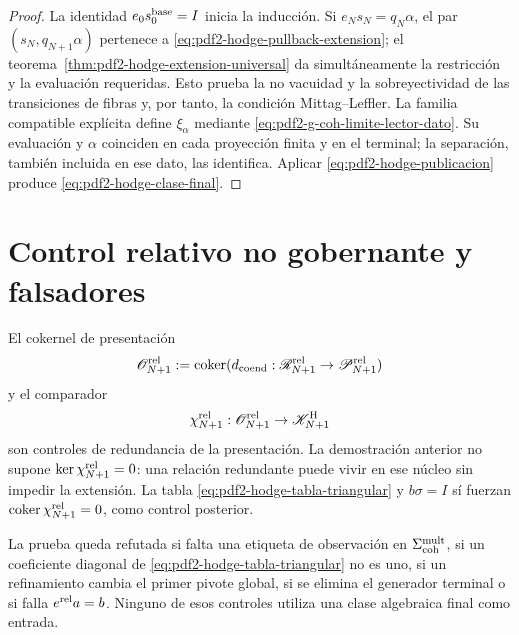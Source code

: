 \begin{proof}
La identidad $e_0s_0^{\rm base}=I$ inicia la inducción. Si
$e_Ns_N=q_N\alpha$, el par $(s_N,q_{N+1}\alpha)$ pertenece a
\eqref{eq:pdf2-hodge-pullback-extension}; el
teorema~\ref{thm:pdf2-hodge-extension-universal} da simultáneamente la restricción
y la evaluación requeridas. Esto prueba la no vacuidad y la sobreyectividad de
las transiciones de fibras y, por tanto, la condición Mittag--Leffler. La
familia compatible explícita define $\xi_\alpha$ mediante
\eqref{eq:pdf2-g-coh-limite-lector-dato}. Su evaluación y $\alpha$
coinciden en cada proyección finita y en el terminal; la separación, también
incluida en ese dato, las identifica. Aplicar
\eqref{eq:pdf2-hodge-publicacion} produce
\eqref{eq:pdf2-hodge-clase-final}.
\end{proof}

\section{Control relativo no gobernante y falsadores}

El cokernel de presentación
\begin{equation}\label{eq:pdf2-hodge-o-rel}
 \mathscr O_{N+1}^{\rm rel}:=\operatorname{coker}
 (d_{\rm coend}:\mathscr R_{N+1}^{\rm rel}\to
                  \mathscr P_{N+1}^{\rm rel})
\end{equation}
y el comparador
\begin{equation}\label{eq:pdf2-hodge-chi-rel}
 \chi_{N+1}^{\rm rel}:\mathscr O_{N+1}^{\rm rel}\to
 \mathscr K^{\rm H}_{N+1}
\end{equation}
son controles de redundancia de la presentación. La demostración anterior
no supone $\ker\chi_{N+1}^{\rm rel}=0$: una relación redundante puede vivir
en ese núcleo sin impedir la extensión. La tabla
\eqref{eq:pdf2-hodge-tabla-triangular} y
$b\sigma=I$ sí fuerzan
$\operatorname{coker}\chi_{N+1}^{\rm rel}=0$, como control posterior.

\begin{falsifier}
La prueba queda refutada si falta una etiqueta de observación en
$\Sigma_{\rm coh}^{\rm mult}$, si un coeficiente diagonal de
\eqref{eq:pdf2-hodge-tabla-triangular} no es uno, si un refinamiento cambia
el primer pivote global, si se elimina el generador terminal o si falla
$e^{\rm rel}a=b$. Ninguno de esos controles utiliza una clase algebraica
final como entrada.
\end{falsifier}


